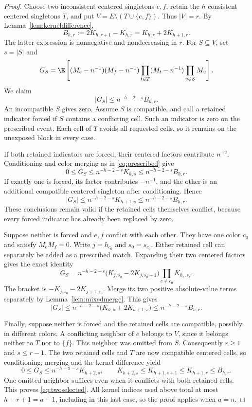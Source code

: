 \begin{proof}
Choose two inconsistent centered singletons $e,f$, retain the $h$ consistent centered singletons $T$, and put $V=E\setminus(T\cup\{e,f\})$. Thus $|V|=r$. By Lemma~\ref{lem:kerneldifference},
\[
B_{h,r}:=2K_{h,r+1}-K_{h,r}
=K_{h,r}+2K_{h+1,r}.
\]
The latter expression is nonnegative and nondecreasing in $r$. For $S\subseteq V$, set $s=|S|$ and
\[
G_S=\E\left[(M_e-n^{-1})(M_f-n^{-1})
\prod_{t\in T}(M_t-n^{-1})\prod_{v\in S}M_v\right].
\]
We claim
\begin{equation}\label{eq:twoselected}
|G_S|\le n^{-h-2-s}B_{h,r}.
\end{equation}
An incompatible $S$ gives zero. Assume $S$ is compatible, and call a retained indicator forced if $S$ contains a conflicting cell. Such an indicator is zero on the prescribed event. Each cell of $T$ avoids all requested cells, so it remains on the unexposed block in every case.

If both retained indicators are forced, their centered factors contribute $n^{-2}$. Conditioning and color merging as in \eqref{eq:prescribed} give
\[
0\le G_S\le n^{-h-2-s}K_{h,s}
\le n^{-h-2-s}B_{h,r}.
\]
If exactly one is forced, its factor contributes $-n^{-1}$, and the other is an additional compatible centered singleton after conditioning. Hence
\[
|G_S|\le n^{-h-2-s}K_{h+1,s}
\le n^{-h-2-s}B_{h,r}.
\]
These conclusions remain valid if the retained cells themselves conflict, because every forced indicator has already been replaced by zero.

Suppose neither is forced and $e,f$ conflict with each other. They have one color $c_0$ and satisfy $M_eM_f=0$. Write $j=h_{c_0}$ and $s_0=s_{c_0}$. Either retained cell can separately be added as a prescribed match. Expanding their two centered factors gives the exact identity
\[
G_S=n^{-h-2-s}
\bigl(K_{j,s_0}-2K_{j,s_0+1}\bigr)
\prod_{c\ne c_0}K_{h_c,s_c}.
\]
The bracket is $-K_{j,s_0}-2K_{j+1,s_0}$. Merge its two positive absolute-value terms separately by Lemma~\ref{lem:mixedmerge}. This gives
\[
|G_S|\le n^{-h-2-s}
\bigl(K_{h,s}+2K_{h+1,s}\bigr)
\le n^{-h-2-s}B_{h,r}.
\]

Finally, suppose neither is forced and the retained cells are compatible, possibly in different colors. A conflicting neighbor of $e$ belongs to $V$, since it belongs neither to $T$ nor to $\{f\}$. This neighbor was omitted from $S$. Consequently $r\ge1$ and $s\le r-1$. The two retained cells and $T$ are now compatible centered cells, so conditioning, merging and the kernel difference yield
\[
0\le G_S\le n^{-h-2-s}K_{h+2,s},
\qquad
K_{h+2,s}\le K_{h+1,s+1}\le K_{h+1,r}\le B_{h,r}.
\]
One omitted neighbor suffices even when it conflicts with both retained cells. This proves \eqref{eq:twoselected}. All kernel indices used above total at most $h+r+1=a-1$, including in this last case, so the proof applies when $a=n$.


\end{proof}
